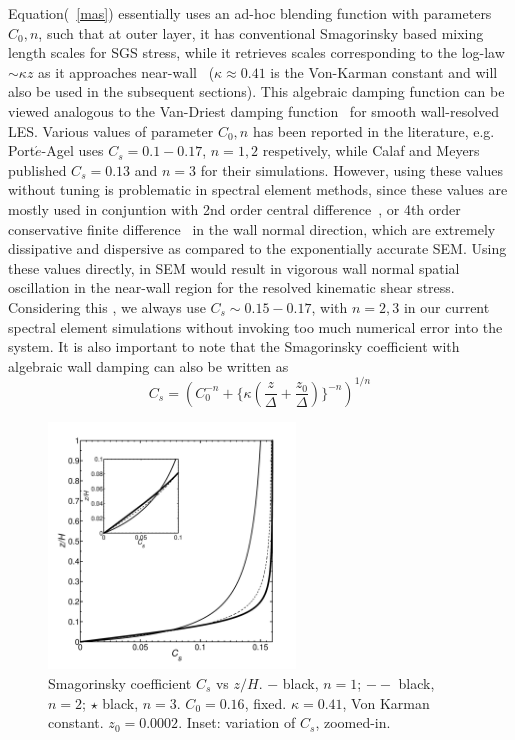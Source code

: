 \documentclass[times]{fldauth}
\begin{document}
Equation(~\ref{mas}) essentially uses an ad-hoc blending function with parameters $C_0, n$, such that at outer layer, it has conventional Smagorinsky based mixing length scales for SGS stress, while it retrieves scales corresponding to the log-law $\sim \kappa z$ as it approaches near-wall~\cite{mason0,mason} ($\kappa \approx 0.41$ is the Von-Karman constant and will also be used in the subsequent sections). This algebraic damping function can be viewed analogous to the Van-Driest damping function~\cite{van-Driest,bers} for smooth wall-resolved LES. Various values of parameter $C_0, n$ has been reported in the literature, e.g. Port$\acute{e}$-Agel uses $C_s = 0.1-0.17$, $n = 1,2$ respetively, while Calaf and Meyers~\cite{calaf} published $C_s = 0.13$ and $n = 3$ for their simulations. However, using these values without tuning is problematic in spectral element methods, since these values are mostly used in conjuntion with 2nd order central difference~\cite{porte1fun,porte1a}, or 4th order conservative finite difference~\cite{meyers2} in the wall normal direction, which are extremely dissipative and dispersive as compared to the exponentially accurate SEM. Using these values directly, in SEM would result in vigorous wall normal spatial oscillation in the near-wall region for the resolved kinematic shear stress. Considering this , we always use $C_s \sim 0.15-0.17$, with $n = 2, 3$ in our current spectral element simulations without invoking too much numerical error into the system. It is also important to note that the Smagorinsky coefficient with algebraic wall damping can also be written as
\begin{equation}
C_s = (C_0^{-n} + \{\kappa(\frac{z}{\Delta} + \frac{z_0}{\Delta})\}^{-n})^{1/n}
\end{equation}
\begin{figure}
       \centering
          \includegraphics[width= 65.5mm]{Figure/Smag.pdf}
       \caption{Smagorinsky coefficient $C_s$ vs $z/H$. $-$ black, $n = 1$; $--$ black, $n = 2$; $\star$ black, $n = 3$. $C_0 = 0.16$, fixed. $\kappa = 0.41$, Von Karman constant. $z_0 = 0.0002$. Inset: variation of $C_s$, zoomed-in. }
\label{fig:figure_smag}
\end{figure}
\end{document}
